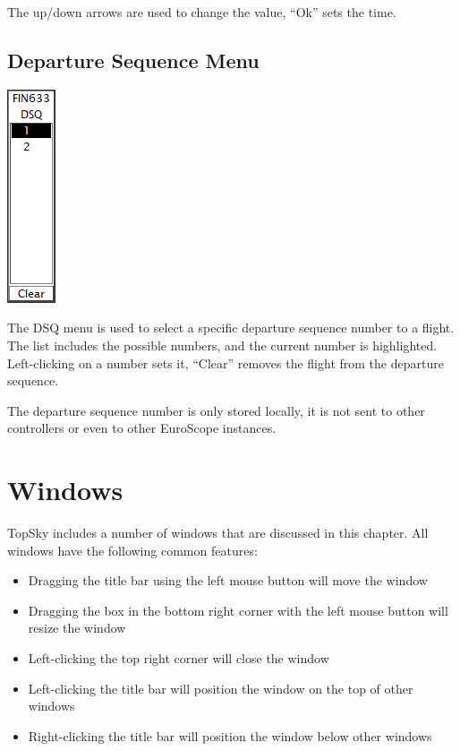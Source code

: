 \documentclass[11pt,a4paper,oldfontcommands]{memoir}
\newenvironment{Note}
  {\begin{shaded}\marginnote{\fbox{Note}}}
  {\end{shaded}}
\begin{document}
The up/down arrows are used to change the value, “Ok” sets the time.

\subsection{Departure Sequence Menu}
\label{dqm}
\includegraphics{img/dsq.png}

The DSQ menu is used to select a specific departure sequence number to a flight. The list includes the possible numbers, and the current number is highlighted. Left-clicking on a number sets it, “Clear” removes the flight from the departure sequence.

\begin{Note}
The departure sequence number is only stored locally, it is not sent to other controllers or even to other EuroScope instances.
\end{Note}

\section{Windows}
TopSky includes a number of windows that are discussed in this chapter. All windows have the following common features:

\begin{itemize}
    \item Dragging the title bar using the left mouse button will move the window
    \item Dragging the box in the bottom right corner with the left mouse button will resize the window
    \item Left-clicking the top right corner will close the window
    \item Left-clicking the title bar will position the window on the top of other windows
    \item Right-clicking the title bar will position the window below other windows
\end{itemize}
\end{document}
